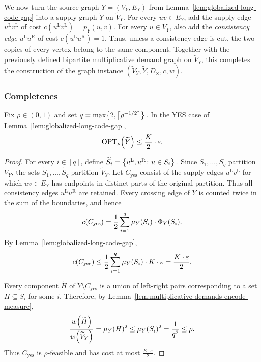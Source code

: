 We now turn the source graph $Y=(V_Y,E_Y)$ from Lemma~\ref{lem:globalized-long-code-gap} into a supply graph $\widetilde Y$ on $\widetilde V_Y$. For every $uv\in E_Y$, add the supply edge $u^{\mathrm L}v^{\mathrm L}$ of cost $c(u^{\mathrm L}v^{\mathrm L})=p_Y(u,v)$. For every $u\in V_Y$, also add the \emph{consistency edge} $u^{\mathrm L}u^{\mathrm R}$ of cost $c(u^{\mathrm L}u^{\mathrm R})=1$. Thus, unless a consistency edge is cut, the two copies of every vertex belong to the same component. Together with the previously defined bipartite multiplicative demand graph on $\widetilde V_Y$, this completes the construction of the graph instance $(\widetilde V_Y,\widetilde Y,D_\times,c,w)$.

\subsubsection{Completenes}
\begin{lemma}\label{lem:sse-gpd-completeness}
    Fix $\rho\in(0,1)$ and set $
        q=\max\mathopen{}\left\{ 2,\left\lceil\rho^{-1/2}\right\rceil \right\}. $
    In the YES case of Lemma~\ref{lem:globalized-long-code-gap},
    \[
        \textup{OPT}_{\rho}\mathopen{}\left( \widetilde Y \right)\leq \frac{K}{2}\cdot\varepsilon.
    \]
\end{lemma}
\begin{proof}
    For every $i\in[q]$, define $
        \widetilde S_i
        =\mathopen{}\left\{ u^{\mathrm L},u^{\mathrm R}\colon u\in S_i \right\}.$
    Since $S_1,\ldots,S_q$ partition $V_Y$, the sets $\widetilde S_1,\ldots,\widetilde S_q$ partition $\widetilde V_Y$. Let $C_{\mathrm{yes}}$ consist of the supply edges $u^{\mathrm L}v^{\mathrm L}$ for which $uv\in E_Y$ has endpoints in distinct parts of the original partition. Thus all consistency edges $u^{\mathrm L}u^{\mathrm R}$ are retained. Every crossing edge of $Y$ is counted twice in the sum of the boundaries, and hence
    \[
        c\mathopen{}\left( C_{\mathrm{yes}} \right)
        =\frac{1}{2}\sum_{i=1}^{q}\mu_Y(S_i)\cdot\Phi_Y(S_i).
    \]
    By Lemma~\ref{lem:globalized-long-code-gap},
    \[
        c\mathopen{}\left( C_{\mathrm{yes}} \right)
        \leq\frac{1}{2}\sum_{i=1}^{q}\mu_Y(S_i)\cdot K\cdot\varepsilon
        =\frac{K\cdot\varepsilon}{2}.
    \]

    Every component $\widetilde H$ of $\widetilde Y\setminus C_{\mathrm{yes}}$ is a union of left-right pairs corresponding to a set $H\subseteq S_i$ for some $i$. Therefore, by Lemma~\ref{lem:multiplicative-demands-encode-measure},
    \[
        \frac{w\mathopen{}\left( \widetilde H \right)}{w\mathopen{}\left( \widetilde V_Y \right)}
        =\mu_Y(H)^2
        \leq\mu_Y(S_i)^2
        =\frac{1}{q^2}
        \leq\rho.
    \]
    Thus $C_{\mathrm{yes}}$ is $\rho$-feasible and has cost at most $\frac{K\cdot\varepsilon}{2}$.
\end{proof}

